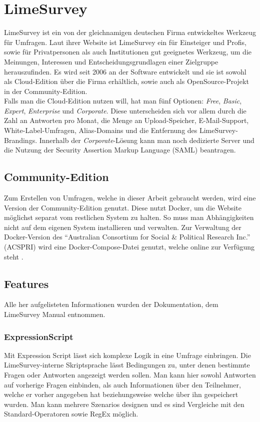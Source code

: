 \section{LimeSurvey}

LimeSurvey ist ein von der gleichnamigen deutschen Firma entwickeltes Werkzeug für Umfragen.
Laut ihrer Website\cite{ls} ist LimeSurvey ein für Einsteiger und Profis, sowie für Privatpersonen als auch Institutionen gut geeignetes Werkzeug, um die Meinungen, Interessen und Entscheidungsgrundlagen einer Zielgruppe herauszufinden.
Es wird seit 2006 an der Software entwickelt und sie ist sowohl als Cloud-Edition über die Firma erhältlich, sowie auch als OpenSource-Projekt in der Community-Edition.\\

Falls man die Cloud-Edition nutzen will, hat man fünf Optionen: \textit{Free}, \textit{Basic}, \textit{Expert}, \textit{Enterprise} und \textit{Corporate}.
Diese unterscheiden sich vor allem durch die Zahl an Antworten pro Monat, die Menge an Upload-Speicher, E-Mail-Support, White-Label-Umfragen, Alias-Domains und die Entfernung des LimeSurvey-Brandings.
Innerhalb der \textit{Corporate}-Lösung kann man noch dedizierte Server und die Nutzung der Security Assertion Markup Language (SAML) beantragen.

\subsection{Community-Edition}

Zum Erstellen von Umfragen, welche in dieser Arbeit gebraucht werden, wird eine Version der Community-Edition genutzt.
Diese nutzt Docker, um die Website möglichst separat vom restlichen System zu halten.
So muss man Abhängigkeiten nicht auf dem eigenen System installieren und verwalten.
Zur Verwaltung der Docker-Version des \enquote{Australian Consortium for Social \& Political Research Inc.} (ACSPRI) wird eine Docker-Compose-Datei genutzt, welche online zur Verfügung steht \cite{docker_comp}.

\subsection{Features}

Alle her aufgelisteten Informationen wurden der Dokumentation, dem LimeSurvey Manual\cite{lsm} entnommen.

\subsubsection{ExpressionScript}
\label{m:expr_script}
Mit Expression Script lässt sich komplexe Logik in eine Umfrage einbringen.
Die LimeSurvey-interne Skriptsprache lässt Bedingungen zu, unter denen bestimmte Fragen oder Antworten angezeigt werden sollen.
Man kann hier sowohl Antworten auf vorherige Fragen einbinden, als auch Informationen über den Teilnehmer, welche er vorher angegeben hat beziehungsweise welche über ihn gespeichert wurden.
Man kann mehrere Szenarios designen und es sind Vergleiche mit den Standard-Operatoren sowie RegEx möglich.


